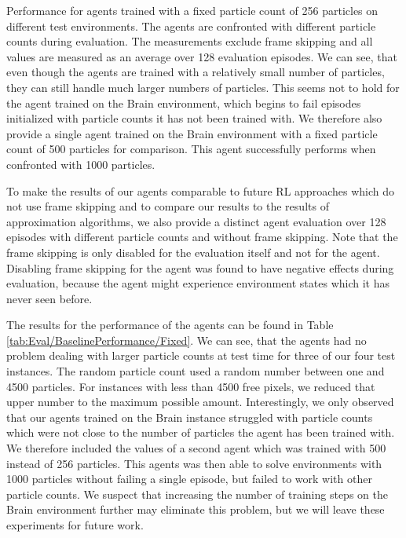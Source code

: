 \begin{table} [htp]
\begin{center}
    \end{center}
    \caption[Baseline Performance for Agents Trained with a Fixed Particle Count]{Performance for agents trained with a fixed particle count of 256 particles on different test environments. The agents are confronted with different particle counts during evaluation. The measurements exclude frame skipping and all values are measured as an average over 128 evaluation episodes. We can see, that even though the agents are trained with a relatively small number of particles, they can still handle much larger numbers of particles. This seems not to hold for the agent trained on the Brain environment, which begins to fail episodes initialized with particle counts it has not been trained with. We therefore also provide a single agent trained on the Brain environment with a fixed particle count of 500 particles for comparison. This agent successfully performs when confronted with 1000 particles. } \label{tab:Eval/BaselinePerformance/Fixed}
\end{table}

To make the results of our agents comparable to future RL approaches which do not use frame skipping and to compare our results to the results of approximation algorithms, we also provide a distinct agent evaluation over 128 episodes with different particle counts and without frame skipping. Note that the frame skipping is only disabled for the evaluation itself and not for the agent. Disabling frame skipping for the agent was found to have negative effects during evaluation, because the agent might experience environment states which it has never seen before.

The results for the performance of the agents can be found in Table \ref{tab:Eval/BaselinePerformance/Fixed}. We can see, that the agents had no problem dealing with larger particle counts at test time for three of our four test instances. The random particle count used a random number between one and 4500 particles. For instances with less than 4500 free pixels, we reduced that upper number to the maximum possible amount. Interestingly, we only observed that our agents trained on the Brain instance struggled with particle counts which were not close to the number of particles the agent has been trained with. We therefore included the values of a second agent which was trained with 500 instead of 256 particles. This agents was then able to solve environments with 1000 particles without failing a single episode, but failed to work with other particle counts. We suspect that increasing the number of training steps on the Brain environment further may eliminate this problem, but we will leave these experiments for future work.

